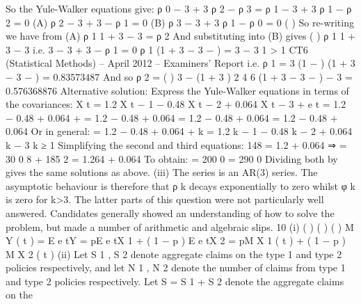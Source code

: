 \documentclass[a4paper,12pt]{article}
\begin{document}
So the Yule-Walker equations give:
ρ 0 − 3  + 3  ρ 2 −  ρ 3 = 
ρ 1 − 3 \alpha + 3  ρ 1 −  ρ 2 = 0 (A)
ρ 2 − 3  + 3  −  ρ 1 = 0 (B)
ρ 3 − 3  + 3  ρ 1 −  ρ 0 = 0
(
)
So re-writing we have from (A) ρ 1 1 + 3  − 3 \alpha =  ρ 2
And substituting into (B) gives
(
)
ρ 1 1 + 3  − 3 \alpha
\alpha
i.e.
3
− 3  + 3  −  ρ 1 = 0
ρ 1 (1 + 3  − 3  −  )
=
3 \alpha − 3 
1
> 1
\alphaSubject CT6 (Statistical Methods) – April 2012 – Examiners’ Report
i.e.
ρ 1 =
3 \alpha (1 −  )
(1 + 3  − 3  −  )
= 0.83573487
And so
ρ 2 =
(
)
3  −  (1 + 3  )
2
4
6
(1 + 3 \alpha − 3 \alpha − \alpha ) 
−
3
= 0.576368876
Alternative solution:
Express the Yule-Walker equations in terms of the covariances:
X t = 1.2 X t − 1 − 0.48 X t − 2 + 0.064 X t − 3 + e t
 = 1.2  − 0.48  + 0.064  + 
 = 1.2  − 0.48  + 0.064 
 = 1.2  − 0.48  + 0.064 
 = 1.2  − 0.48  + 0.064 
Or in general:
 = 1.2  − 0.48  + 0.064  + 
\gamma k = 1.2 \gamma k − 1 − 0.48 \gamma k − 2 + 0.064 \gamma k − 3 k ≥ 1
Simplifying the second and third equations:
148  = 1.2  + 0.064  ⇒  =
30  0
8 \gamma
+ 185
2
 = 1.264  + 0.064 
To obtain:
 =
200  0
 =
290  0
Dividing both by  gives the same solutions as above.
(iii)
The series is an AR(3) series. The asymptotic behaviour is therefore that ρ k
decays exponentially to zero
whilst φ k is zero for k>3.
The latter parts of this question were not particularly well answered. Candidates generally
showed an understanding of how to solve the problem, but made a number of arithmetic and
algebraic slips.
\new%
10
(i)
( )
( )
( )
M Y ( t ) = E e tY = pE e tX 1 + ( 1 − p ) E e tX 2
= pM X 1 ( t ) + ( 1 − p ) M X 2 ( t )
(ii)
Let S 1 , S 2 denote aggregate claims on the type 1 and type 2 policies
respectively, and let N 1 , N 2 denote the number of claims from type 1 and type
2 policies respectively. Let S = S 1 + S 2 denote the aggregate claims on the
\end{document}
